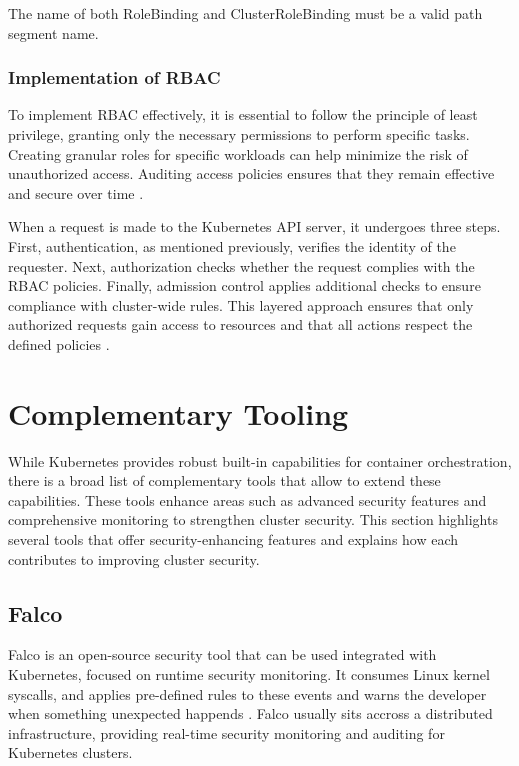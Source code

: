 \documentclass[a4paper,11pt,openright,BCOR=15mm]{scrbook}
\begin{document}
The name of both RoleBinding and ClusterRoleBinding must be a valid path segment name.
	

\subsection{Implementation of RBAC}

To implement RBAC effectively, it is essential to follow the principle of least privilege, granting only the necessary permissions to perform specific tasks. Creating granular roles for specific workloads can help minimize the risk of unauthorized access. Auditing access policies ensures that they remain effective and secure over time \cite{rostami_role-based_2023}.

When a request is made to the Kubernetes API server, it undergoes three steps. First, authentication, as mentioned previously, verifies the identity of the requester. Next, authorization checks whether the request complies with the RBAC policies. Finally, admission control applies additional checks to ensure compliance with cluster-wide rules. This layered approach ensures that only authorized requests gain access to resources and that all actions respect the defined policies \cite{the_linux_foundation_rbacauthorization_2024}.




		
\chapter{Complementary Tooling}\label{chapt:comp}

While Kubernetes provides robust built-in capabilities for container orchestration, there is a broad list of complementary tools that allow to extend these capabilities.  These tools enhance areas such as advanced security features and comprehensive monitoring to strengthen cluster security. This section highlights several tools that offer security-enhancing features and explains how each contributes to improving cluster security.

\section{Falco}\label{sect:complementNetSec}

Falco is an open-source security tool that can be used integrated with Kubernetes, focused on runtime security monitoring. It consumes Linux kernel syscalls, and applies pre-defined rules to these events and warns the developer when something unexpected happends \cite{falco_about_page}. Falco usually sits accross a distributed infrastructure, providing real-time security monitoring and auditing for Kubernetes clusters.
\end{document}
